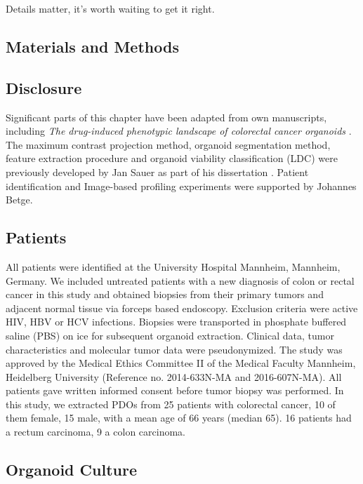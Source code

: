 \begin{savequote}[75mm]
Details matter, it’s worth waiting to get it right.
\end{savequote}

\begin{flushleft}
\chapter{Materials and Methods}

\section{Disclosure}
Significant parts of this chapter have been adapted from own manuscripts, including \textit{The drug-induced phenotypic landscape of colorectal cancer organoids} \cite{Betge2022-kr}. The maximum contrast projection method, organoid segmentation method, feature extraction procedure and organoid viability classification (LDC) were previously developed by Jan Sauer as part of his dissertation \cite{noauthor_undated-ij}. Patient identification and Image-based profiling experiments were supported by Johannes Betge. 

\section{Patients}
All patients were identified at the University Hospital Mannheim, Mannheim, Germany. We included untreated patients with a new diagnosis of colon or rectal cancer in this study and obtained biopsies from their primary tumors and adjacent normal tissue via forceps based endoscopy. Exclusion criteria were active HIV, HBV or HCV infections. Biopsies were transported in phosphate buffered saline (PBS) on ice for subsequent organoid extraction. Clinical data, tumor characteristics and molecular tumor data were pseudonymized. The study was approved by the Medical Ethics Committee II of the Medical Faculty Mannheim, Heidelberg University (Reference no. 2014-633N-MA and 2016-607N-MA). All patients gave written informed consent before tumor biopsy was performed. In this study, we extracted PDOs from 25 patients with colorectal cancer, 10 of them female, 15 male, with a mean age of 66 years (median 65). 16 patients had a rectum carcinoma, 9 a colon carcinoma.

\section{Organoid Culture}


\end{flushleft}
